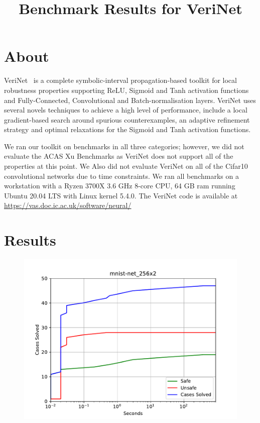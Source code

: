 
\title{Benchmark Results for VeriNet}



\maketitle

\section{About}

VeriNet~\cite{HenriksenLomuscio20} is a complete symbolic-interval
propagation-based toolkit for local robustness properties supporting
ReLU, Sigmoid and Tanh activation functions and Fully-Connected,
Convolutional and Batch-normalisation layers. VeriNet uses several
novels techniques to achieve a high level of performance, include a
local gradient-based search around spurious counterexamples, an
adaptive refinement strategy and optimal relaxations for the Sigmoid
and Tanh activation functions. 

We ran our toolkit on benchmarks in all three categories; however, we
did not evaluate the ACAS Xu Benchmarks as VeriNet does not support
all of the properties at this point. We Also did not evaluate VeriNet
on all of the Cifar10 convolutional networks due to time constraints.
We ran all benchmarks on a workstation with a Ryzen 3700X 3.6 GHz
8-core CPU, 64 GB ram running Ubuntu 20.04 LTS with Linux kernel
5.4.0. The VeriNet code is available at
\url{https://vas.doc.ic.ac.uk/software/neural/}

\section{Results}
\begin{figure}[!ht]
\center
\includegraphics[scale=0.8]{figures/mnist-net_256x2.pdf}
\end{figure}

